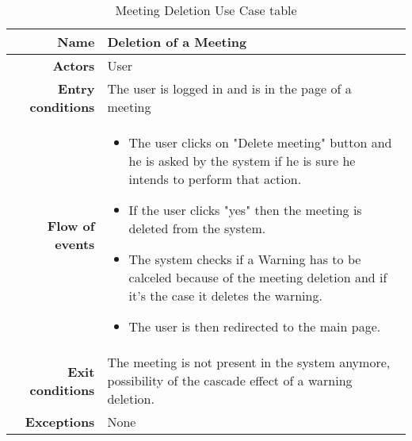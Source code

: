 \begin{table}[htp]

\begin{tabular}{r|p{7cm}}
\bf\large Name&\bf\large Deletion of a Meeting\\
\hline
\hline
\bf Actors&User\\
\hline
\bf Entry conditions&The user is logged in and is in the page of a meeting\\
\hline
\bf Flow of events&
\begin{itemize}

\item The user clicks on "Delete meeting" button and he is asked by the system if he is sure he intends to perform that action.

\item If the user clicks "yes" then the meeting is deleted from the system.

\item The system checks if a Warning has to be calceled because of the meeting deletion and if it's the case it deletes the warning.


\item The user is then redirected to the main page.

\end{itemize}
\\
\hline
\bf Exit conditions&The meeting is not present in the system anymore, possibility of the cascade effect of a warning deletion.\\
\hline
\bf Exceptions&None
\\
\hline

\end{tabular}
\caption{Meeting Deletion Use Case table}
 \label{tab:meetingdeletion}
\end{table}